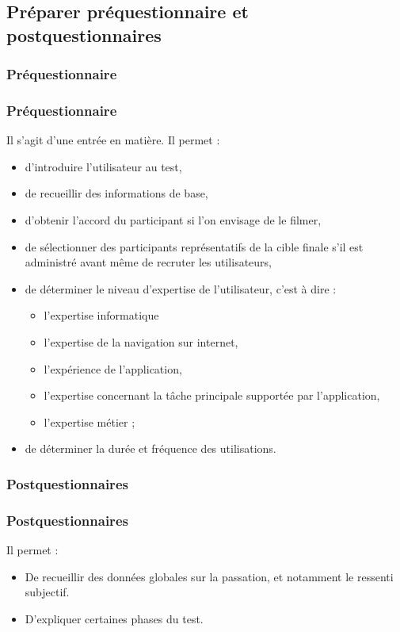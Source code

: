 				
				
					   
					
		
		
	\subsection{Préparer préquestionnaire et postquestionnaires} 
		
		\subsubsection{Préquestionnaire}
		\begin{frame}[allowframebreaks]
		\frametitle{Préquestionnaire}
			Il s'agit d'une entrée en matière. Il permet :
			\begin {itemize}
				      \item d'introduire l'utilisateur au test,
				      \item de recueillir des informations de base, 
				      \item d'obtenir l'accord du participant si l'on envisage de le filmer,
				      \item de sélectionner des participants représentatifs de la cible finale s'il est administré avant même de recruter les utilisateurs,
				      \item de déterminer le niveau d'expertise de l'utilisateur, c'est à dire :
				      \begin {itemize}
				      \item l'expertise informatique
				      \item l'expertise de la navigation sur internet, 
				      \item l'expérience de l'application, 
				      \item l'expertise concernant la tâche principale supportée par l'application,
				      \item l'expertise métier ;
				      \end{itemize}
				      \item de déterminer la durée et fréquence des utilisations.


			\end{itemize}
		\end{frame}
		
		\subsubsection{Postquestionnaires}
		\begin{frame}[allowframebreaks]
		\frametitle{Postquestionnaires}
			Il permet :
			\begin {itemize}
				      \item De recueillir des données globales sur la passation, et notamment le ressenti subjectif. 
				      \item D'expliquer certaines phases du test. 
			\end{itemize}
		\end{frame}
		
